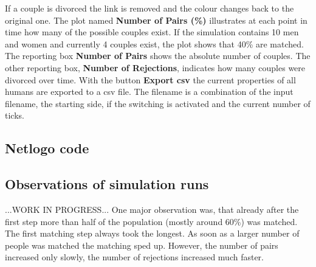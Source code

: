 If a couple is divorced the link is removed and the colour changes back to the original one.
The plot named \textbf{Number of Pairs (\%)} illustrates at each point in time how many of the possible couples exist. 
If the simulation contains 10 men and women and currently 4 couples exist, the plot shows that 40\% are matched.
The reporting box \textbf{Number of Pairs} shows the absolute number of couples.
The other reporting box, \textbf{Number of Rejections}, indicates how many couples were divorced over time.
With the button \textbf{Export csv} the current properties of all humans are exported to a csv file.
The filename is a combination of the input filename, the starting side, if the switching is activated and the current number of ticks.

\subsection{Netlogo code}


\subsection{Observations of simulation runs}
...WORK IN PROGRESS...
One major observation was, that already after the first step more than half of the population (mostly around 60\%) was matched.
The first matching step always took the longest.
As soon as a larger number of people was matched the matching sped up.
However, the number of pairs increased only slowly, the number of rejections increased much faster.
